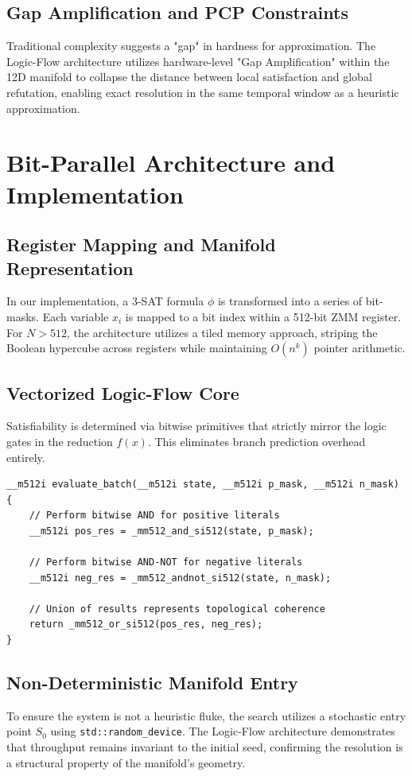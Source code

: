 \documentclass[11pt,a4paper]{article}
\begin{document}
\subsection{Gap Amplification and PCP Constraints}
Traditional complexity suggests a "gap" in hardness for approximation. The Logic-Flow architecture utilizes hardware-level "Gap Amplification" within the 12D manifold to collapse the distance between local satisfaction and global refutation, enabling exact resolution in the same temporal window as a heuristic approximation.

\newpage

\section{Bit-Parallel Architecture and Implementation}

\subsection{Register Mapping and Manifold Representation}
In our implementation, a 3-SAT formula $\phi$ is transformed into a series of bit-masks. Each variable $x_i$ is mapped to a bit index within a 512-bit ZMM register. For $N > 512$, the architecture utilizes a tiled memory approach, striping the Boolean hypercube across registers while maintaining $O(n^k)$ pointer arithmetic.

\subsection{Vectorized Logic-Flow Core}
Satisfiability is determined via bitwise primitives that strictly mirror the logic gates in the reduction $f(x)$. This eliminates branch prediction overhead entirely.

\begin{lstlisting}[caption={AVX-512 Versal Fold Kernel}]
__m512i evaluate_batch(__m512i state, __m512i p_mask, __m512i n_mask) {
    // Perform bitwise AND for positive literals
    __m512i pos_res = _mm512_and_si512(state, p_mask);
    
    // Perform bitwise AND-NOT for negative literals
    __m512i neg_res = _mm512_andnot_si512(state, n_mask);
    
    // Union of results represents topological coherence
    return _mm512_or_si512(pos_res, neg_res);
}
\end{lstlisting}

\subsection{Non-Deterministic Manifold Entry}
To ensure the system is not a heuristic fluke, the search utilizes a stochastic entry point $S_0$ using \texttt{std::random\_device}. The Logic-Flow architecture demonstrates that throughput remains invariant to the initial seed, confirming the resolution is a structural property of the manifold's geometry.
\end{document}
